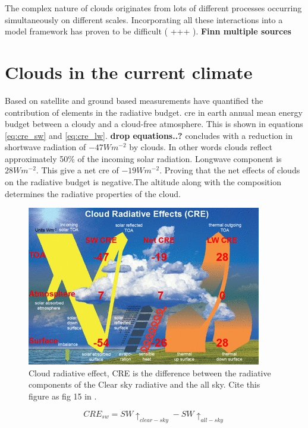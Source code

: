 The complex nature of clouds originates from lots of different processes occurring simultaneously on different scales. Incorporating all these interactions into a model framework has proven to be difficult (\cite{IPCC_CH9_climate_models} +++ ). \textbf{Finn multiple sources} 

\section{Clouds in the current climate} \label{sec:intro_cloud_current_climate}
Based on satellite and ground based measurements \cite{Wild2019TheModels} have quantified the contribution of elements in the radiative budget. \acrfull{cre} in earth annual mean energy budget between a cloudy and a cloud-free atmosphere. This is shown in equations \eqref{eq:cre_sw} and \eqref{eq:cre_lw}. \textbf{drop equations..?}
\cite{Wild2019TheModels} concludes with a reduction in shortwave radiation of $-47Wm^{-2}$ by clouds. In other words clouds reflect approximately 50\% of the incoming solar radiation. Longwave component is $28Wm^{-2}$. This give a net \acrshort{cre} of $-19Wm^{-2}$. Proving that the net effects of clouds on the radiative budget is negative.The altitude along with the composition determines the radiative properties of the cloud. 

\begin{figure}[h]
    \centering
    \includegraphics[scale = 7]{Chapter1_Intro/images/CRE_wild2019.jpg}
    \caption{Cloud radiative effect, CRE is the difference between the radiative components of the Clear sky radiative and the all sky. Cite this figure as fig 15 in \cite{Wild2019TheModels}.}
    \label{fig:cre}
\end{figure}

\begin{equation} \label{eq:cre_sw}
    CRE_{sw} = SW\uparrow_{clear-sky} - SW\uparrow_{all-sky}
\end{equation}

